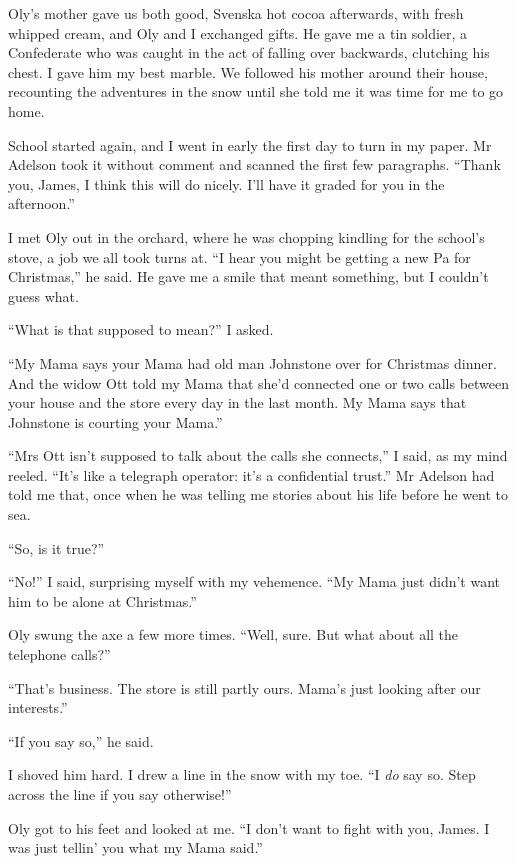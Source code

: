 Oly's mother gave us both good, Svenska hot cocoa afterwards, with
fresh whipped cream, and Oly and I exchanged gifts. He gave me a
tin soldier, a Confederate who was caught in the act of falling
over backwards, clutching his chest. I gave him my best marble. We
followed his mother around their house, recounting the adventures
in the snow until she told me it was time for me to go home.

\tb

School started again, and I went in early the first day to turn in
my paper. Mr Adelson took it without comment and scanned the first
few paragraphs.
``Thank you, James, I think this will do nicely. I'll have it graded for you in 
the afternoon.''

I met Oly out in the orchard, where he was chopping kindling for
the school's stove, a job we all took turns at.
``I hear you might be getting a new Pa for Christmas,'' he said. He
gave me a smile that meant something, but I couldn't guess what.

``What is that supposed to mean?'' I asked.

``My Mama says your Mama had old man Johnstone over for Christmas dinner. And 
the widow Ott told my Mama that she'd connected one or two calls between your 
house and the store every day in the last month. My Mama says that Johnstone is 
courting your Mama.''

``Mrs Ott isn't supposed to talk about the calls she connects,'' I
said, as my mind reeled.
``It's like a telegraph operator: it's a confidential trust.'' Mr
Adelson had told me that, once when he was telling me stories about
his life before he went to sea.

``So, is it true?''

``No!'' I said, surprising myself with my vehemence.
``My Mama just didn't want him to be alone at Christmas.''

Oly swung the axe a few more times.
``Well, sure. But what about all the telephone calls?''

``That's business. The store is still partly ours. Mama's just looking after 
our interests.''

``If you say so,'' he said.

I shoved him hard. I drew a line in the snow with my toe.
``I \emph{do} say so. Step across the line if you say otherwise!''

Oly got to his feet and looked at me.
``I don't want to fight with you, James. I was just tellin' you what my Mama 
said.''

